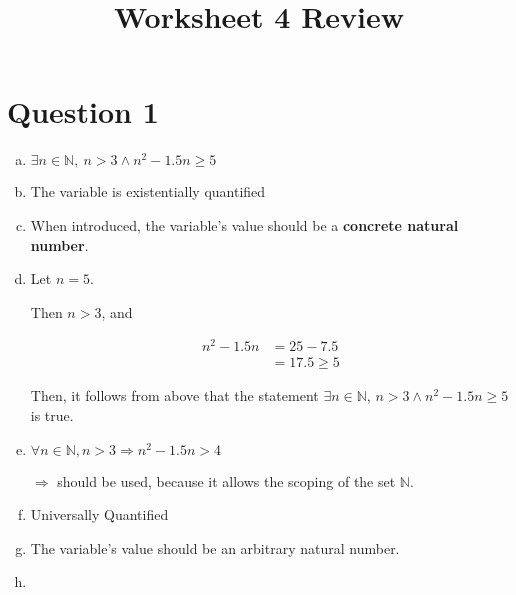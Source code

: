 \documentclass[12pt]{article}
\begin{document}
\title{Worksheet 4 Review}
\maketitle

\section*{Question 1}
\begin{enumerate}[a.]
    \item

    $\exists n \in \mathbb{N},\:n > 3 \land n^2 - 1.5n \geq 5$

    \item

    The variable is existentially quantified

    \item

    When introduced, the variable's value should be a \textbf{concrete natural number}.

    \item

    Let $n = 5$.

    \bigskip

    Then $n > 3$, and

    \begin{align}
        n^2 - 1.5n &= 25 - 7.5\\
        &= 17.5 \geq 5
    \end{align}

    \bigskip

    Then, it follows from above that the statement $\exists n \in \mathbb{N}$,
    $n > 3 \land n^2 -1.5n \geq 5$ is true.

    \item

    $\forall n \in \mathbb{N}, n > 3 \Rightarrow n^2-1.5n > 4$

    \bigskip

    $\Rightarrow$ should be used, because it allows the scoping of the set $\mathbb{N}$.

    \item

    Universally Quantified

    \item

    The variable's value should be an arbitrary natural number.

    \item


\end{enumerate}
\end{document}
